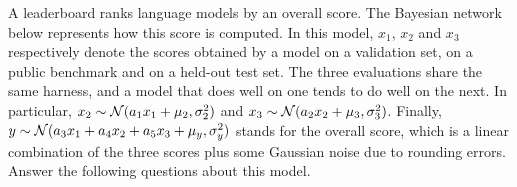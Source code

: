 \documentclass[11pt, a4paper]{exam}
\begin{document}
\begin{exercises}


A leaderboard ranks language models by an overall score. The Bayesian network below represents how this score is computed. In this model, $x_1$, $x_2$ and $x_3$ respectively denote the scores obtained by a model on a validation set, on a public benchmark and on a held-out test set. The three evaluations share the same harness, and a model that does well on one tends to do well on the next. In particular, $x_2 \sim \mathcal{N}(a_1 x_1 + \mu_2, \sigma_2^2)$ and $x_3 \sim \mathcal{N}(a_2 x_2 + \mu_3, \sigma_3^2)$. Finally, $y \sim \mathcal{N}(a_3 x_1 + a_4 x_2 + a_5 x_3 + \mu_y, \sigma_y^2)$ stands for the overall score, which is a linear combination of the three scores plus some Gaussian noise due to rounding errors. Answer the following questions about this model.

\begin{center}
\end{center}

\end{exercises}
\end{document}

